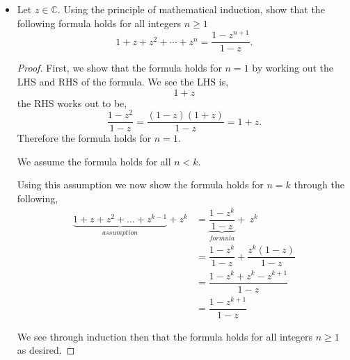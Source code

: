 \documentclass[11pt]{article}
\newenvironment{problem}[2][Problem\!]{\begin{trivlist}
\item[\hskip \labelsep {\bfseries #1}\hskip \labelsep {\bfseries #2}]}{\end{trivlist}}
\newcommand{\cc}{\mathbb C}   %
\renewcommand{\geq}{\geqslant}
\begin{document}
\begin{problem}{2.2}\hfill
\begin{itemize}[itemsep=3em]
\item[(a)] Let $z\in \cc$. Using the principle of mathematical induction, show that the following formula holds for all integers $n\geq 1$
\[1 + z + z^2 + \cdots + z^n = \frac{1-z^{n+1}}{1-z}.\]	
\begin{example}
    \begin{proof}
        First, we show that the formula holds for $n = 1$ by working out the LHS and RHS of the formula. We see the LHS is,
        \[1 + z\]
        the RHS works out to be,
        \[\dfrac{1 - z^{2}}{1-z} = \dfrac{(1-z)(1+z)}{1-z} = 1 + z.\]
        Therefore the formula holds for $n = 1$. 

        We assume the formula holds for all $n < k $. 

        Using this assumption we now show the formula holds for $ n = k$ through the following,
        \begin{align*}
            \underbrace{1 + z + z^{2} + \dots + z^{k - 1}}_{assumption} + z^{k} &= \underbrace{\dfrac{1 - z^{k}}{1-z}}_{formula} +\ z^{k} \\
            &=\dfrac{1 - z^{k}}{1-z}+ \dfrac{z^{k}(1-z)}{1-z}  \\ 
            &= \dfrac{1 - z^{k} + z^{k} - z^{k + 1}}{1-z} \\
            &= \dfrac{1 -z^{k + 1}}{1- z}
        \end{align*}
         
        We see through induction then that the formula holds for all integers $n\geq 1 $ as desired. 
        

\end{proof}
\end{example}
\end{itemize}
\end{problem}
\end{document}

